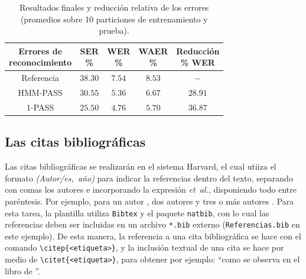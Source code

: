 \documentclass[esp]{FCEFyN-class}
\begin{document}
\begin{table}[!b]
 \centering
  \caption{Resultados finales y reducción relativa de los errores (promedios sobre 10 particiones de
 entrenamiento y prueba).} \label{tabla-1}
 {\small
 \begin{tabular}{ccccc}
  \hline
  \hline
  \thead{Errores de \\ reconocimiento} & \thead{SER \\ \%} & \thead{WER \\ \%} & \thead{WAER \\ \%} &
                        \thead{Reducción \\ \% WER} \\
  \hline
  \hline
  Referencia & $38.30$ & $7.54$ & $8.53$ & $-$ \\
  \hline
  HMM-PASS & $30.55$ & $5.36$ & $6.67$ & $28.91$ \\
  1-PASS & $25.50$ & $4.76$ & $5.70$ & $36.87$   \\
  \hline
  \hline
 \end{tabular}}
\end{table}

\subsection{Las citas bibliográficas}
Las citas bibliográficas se realizarán en el sistema Harvard, el cual utiiza el formato
\emph{(Autor/es,~año)} para indicar la referencias dentro del texto, separando con comas los autores e
incorporando la expresión \emph{et~al.}, disponiendo todo entre paréntesis. Por ejemplo, para un autor
\citep{Alarcos1999}, dos autores \citep{ArslanHansen1996} y tres o más autores \citep{WangEtAl2015}.
Para esta tarea, la plantilla utiliza \texttt{Bibtex} y el paquete \texttt{natbib}, con lo cual las
referencias deben ser incluidas en un archivo \texttt{*.bib} externo (\texttt{Referencias.bib} en este
ejemplo).
De esta manera, la referencia a una cita bibliográfica se hace con el comando
\verb!\citep{<etiqueta>}!, y la inclusión textual de una cita se hace por medio de
\verb!\citet{<etiqueta>}!, para obtener por ejemplo: ``como se observa en el libro de
\citet{Mitchell2001}''.
\end{document}
